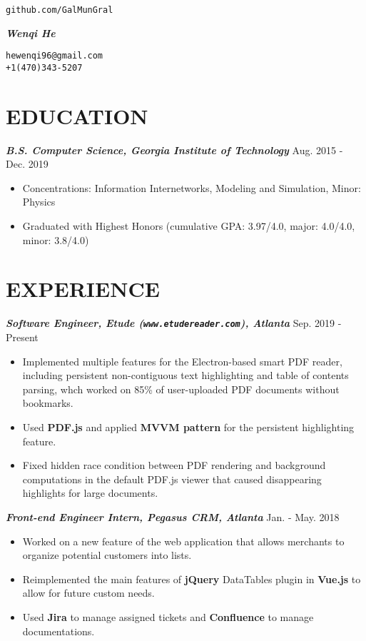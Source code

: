 \documentclass[10pt]{article}
\begin{document}
\noindent
\parbox{0.25\textwidth}{\hfill\texttt{github.com/GalMunGral}}
\parbox{0.5\textwidth}{\centerline{\Huge\slshape\bfseries Wenqi He}}
\parbox{0.25\textwidth}{\texttt{hewenqi96@gmail.com\\+1(470)343-5207}}
%
\vspace{-0.5em}
\section*{EDUCATION}
\textbf{\itshape 
B.S. Computer Science, Georgia Institute of Technology} \hfill {Aug. 2015 - Dec. 2019}
\begin{itemize}[leftmargin=15pt, noitemsep, topsep=0pt]
	\item Concentrations: Information Internetworks, Modeling and Simulation, Minor: Physics
	\item  Graduated with Highest Honors (cumulative GPA: 3.97/4.0, major: 4.0/4.0, minor: 3.8/4.0)
\end{itemize}
%
\vspace{-0.5em}
\section*{EXPERIENCE}
\textbf{\itshape Software Engineer, Etude (\texttt{www.etudereader.com}), Atlanta} \hfill {Sep. 2019 - Present}
\begin{itemize}[leftmargin=15pt, noitemsep, topsep=0pt]
\item Implemented multiple features for the Electron-based smart PDF reader, including persistent non-contiguous text highlighting and table of contents parsing, whch worked on 85\% of user-uploaded PDF documents without bookmarks.
\item Used \textbf{PDF.js} and applied \textbf{MVVM pattern} for the persistent highlighting feature.
\item Fixed hidden race condition between PDF rendering and background computations in the default PDF.js viewer that caused disappearing highlights for large documents.
\end{itemize}
\vspace{0.5em}
\textbf{\itshape Front-end Engineer Intern, Pegasus CRM, Atlanta} \hfill {Jan. - May. 2018}
\begin{itemize}[leftmargin=15pt, noitemsep, topsep=0pt]
\item Worked on a new feature of the web application that allows merchants to organize potential customers into lists.
	\item Reimplemented the main features of \textbf{jQuery} DataTables plugin in \textbf{Vue.js} to allow for future custom needs.
	\item Used \textbf{Jira} to manage assigned tickets and \textbf{Confluence} to manage documentations.
\end{itemize}
%
\vspace{-0.5em}
\end{document}
